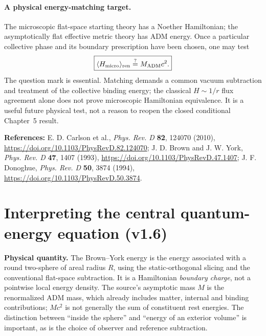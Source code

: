 \documentclass[11pt,a4paper]{article}
\theoremstyle{definition}\newtheorem{definition}[theorem]{Definition}
\theoremstyle{remark}\newtheorem{remark}[theorem]{Remark}
\begin{document}
\paragraph{A physical energy-matching target.}
The microscopic flat-space starting theory has a Noether Hamiltonian;
the asymptotically flat effective metric theory has ADM energy.
Once a particular collective phase and its boundary prescription have
been chosen, one may test
\begin{equation}\label{eq:v15-Hmatching}
 \boxed{\langle H_{\rm micro}\rangle_{\rm ren}
 \overset{?}{=} M_{\rm ADM}c^2.}
\end{equation}
The question mark is essential. Matching demands a common
vacuum subtraction and treatment of the collective binding energy;
the classical $H\sim1/r$ flux agreement alone does not prove
microscopic Hamiltonian equivalence. It is a useful future physical
test, not a reason to reopen the closed conditional Chapter~5 result.

\noindent\textbf{References:} E. D. Carlson et al.,
\emph{Phys. Rev. D} \textbf{82}, 124070 (2010),
\url{https://doi.org/10.1103/PhysRevD.82.124070};
J. D. Brown and J. W. York, \emph{Phys. Rev. D} \textbf{47}, 1407 (1993),
\url{https://doi.org/10.1103/PhysRevD.47.1407};
J. F. Donoghue, \emph{Phys. Rev. D} \textbf{50}, 3874 (1994),
\url{https://doi.org/10.1103/PhysRevD.50.3874}.


\section{Interpreting the central quantum-energy equation (v1.6)}
\label{sec:v16-meaning}
\textbf{Physical quantity.} The Brown--York energy is the energy associated
with a round two-sphere of areal radius $R$, using the static-orthogonal
slicing and the conventional flat-space subtraction. It is a Hamiltonian
\emph{boundary charge}, not a pointwise local energy density. The source's
asymptotic mass $M$ is the renormalized ADM mass, which already includes
matter, internal and binding contributions; $Mc^2$ is not generally the sum
of constituent rest energies. The distinction between ``inside the sphere''
and ``energy of an exterior volume'' is important, as is the choice of
observer and reference subtraction.
\end{document}
